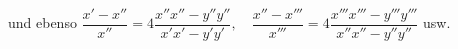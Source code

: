 \expandafter\def\csname HistoricalNoteText30\endcsname{und ebenso
\(\dfrac{x'-x''}{x''}=4\dfrac{x''x''-y''y''}{x'x'-y'y'},\quad
\dfrac{x''-x'''}{x'''}=4\dfrac{x'''x'''-y'''y'''}{x''x''-y''y''}\) usw.
}
